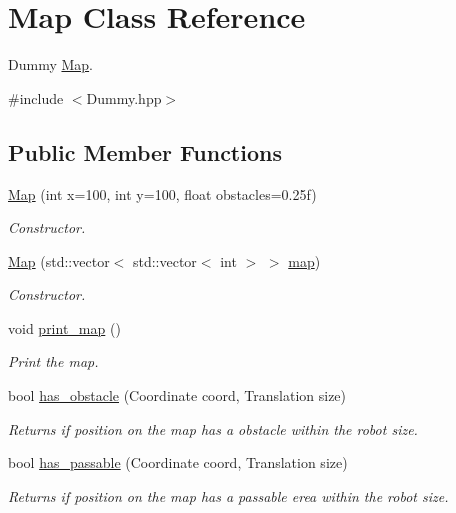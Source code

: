 \hypertarget{class_map}{}\section{Map Class Reference}
\label{class_map}


Dummy \hyperlink{class_map}{Map}.  




{\ttfamily \#include $<$Dummy.\+hpp$>$}

\subsection*{Public Member Functions}
\begin{DoxyCompactItemize}
\item 
\hyperlink{class_map_a2205f271830dc5189f73b7f46da0770e}{Map} (int x=100, int y=100, float obstacles=0.\+25f)
\begin{DoxyCompactList}\small\item\em Constructor. \end{DoxyCompactList}\item 
\hyperlink{class_map_af7916d9ab517490a4a716152569d70ca}{Map} (std\+::vector$<$ std\+::vector$<$ int $>$ $>$ \hyperlink{class_map_a7fbb34f989fcf03bb5717073f882080a}{map})
\begin{DoxyCompactList}\small\item\em Constructor. \end{DoxyCompactList}\item 
void \hyperlink{class_map_a3501397c3e89bf2d874db4541d5bf6e5}{print\+\_\+map} ()
\begin{DoxyCompactList}\small\item\em Print the map. \end{DoxyCompactList}\item 
bool \hyperlink{class_map_a3ad778f596300c295a1ced8f208f3213}{has\+\_\+obstacle} (Coordinate coord, Translation size)
\begin{DoxyCompactList}\small\item\em Returns if position on the map has a obstacle within the robot size. \end{DoxyCompactList}\item 
bool \hyperlink{class_map_a2d929dbb994e4f7d15b392e5b5779cf2}{has\+\_\+passable} (Coordinate coord, Translation size)
\begin{DoxyCompactList}\small\item\em Returns if position on the map has a passable erea within the robot size. \end{DoxyCompactList}\end{DoxyCompactItemize}
